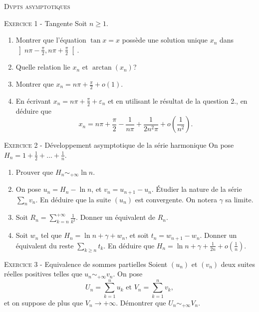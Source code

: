 \documentclass[11pt]{article}
\newcommand{\veps}{\varepsilon}
\begin{document}
 

\begin{center}\textsc{{\huge Dvpts asymptotiques }}\end{center}



\vskip0.3cm\noindent\textsc{Exercice 1} - Tangente
\vskip0.2cm
Soit $n\geq 1$.
\begin{enumerate}
\item Montrer que l'équation $\tan x=x$ possède une solution unique $x_n$ dans $\left]n\pi-\frac\pi2,n\pi+\frac\pi2\right[$.
\item Quelle relation lie $x_n$ et $\arctan(x_n)$?
\item Montrer que $x_n=n\pi+\frac{\pi}{2}+o(1)$.
\item En écrivant $x_n=n\pi+\frac{\pi}{2}+\veps_n$ et en utilisant le résultat de la question 2., en déduire que
$$x_n=n\pi+\frac{\pi}{2}-\frac{1}{n\pi}+\frac{1}{2n^2\pi}+o\left(\frac1{n^2}\right).$$
\end{enumerate}




\vskip0.3cm\noindent\textsc{Exercice 2} - Développement asymptotique de la série harmonique
\vskip0.2cm
On pose $H_n=1+\frac12+\dots+\frac1n$. 
\begin{enumerate}
\item Prouver que $H_n\sim_{+\infty}\ln n$.
\item On pose $u_n=H_n-\ln n$, et $v_n=u_{n+1}-u_n$.
\'Etudier la nature de la série $\sum_n v_n$. En déduire que la suite $(u_n)$ est convergente. On notera $\gamma$ sa limite.
\item Soit $R_n=\sum_{k=n}^{+\infty} \frac{1}{k^2}$. Donner un équivalent de $R_n$.
\item Soit $w_n$ tel que $H_n=\ln n+\gamma+w_n$, et soit 
$t_n=w_{n+1}-w_n$. Donner un équivalent du reste $\sum_{k\geq n}t_k$.
En déduire que $H_n=\ln n+\gamma+\frac{1}{2n}+o\left(\frac1n\right)$.
\end{enumerate}




\vskip0.3cm\noindent\textsc{Exercice 3} - Equivalence de sommes partielles
\vskip0.2cm
Soient $(u_n)$ et $(v_n)$ deux suites réelles positives telles que $u_n\sim_{+\infty}v_n$. On pose
$$U_n=\sum_{k=1}^n u_k\textrm{ et }V_n=\sum_{k=1}^n v_k,$$
et on suppose de plus que $V_n\to+\infty$. Démontrer que $U_n\sim_{+\infty} V_n.$




\vskip0.5cm

\end{document}
